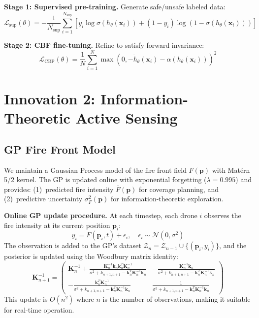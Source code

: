 \documentclass[12pt,a4paper]{article}
\DeclareRobustCommand{\cL}{\mathcal{L}}
\DeclareRobustCommand{\cN}{\mathcal{N}}
\DeclareRobustCommand{\cZ}{\mathcal{Z}}
\DeclareRobustCommand{\vect}[1]{\bm{#1}}
\DeclareRobustCommand{\mat}[1]{\bm{#1}}
\begin{document}
\textbf{Stage 1: Supervised pre-training.} Generate safe/unsafe labeled data:
\begin{equation}
    \cL_{\text{sup}}(\theta) = -\frac{1}{N_{\text{sup}}}\sum_{i=1}^{N_{\text{sup}}} \left[y_i \log \sigma(h_\theta(\vect{x}_i)) + (1-y_i)\log(1-\sigma(h_\theta(\vect{x}_i)))\right]
\end{equation}

\textbf{Stage 2: CBF fine-tuning.} Refine to satisfy forward invariance:
\begin{equation}
    \cL_{\text{CBF}}(\theta) = \frac{1}{N}\sum_{i=1}^{N} \max(0, -\dot{h}_\theta(\vect{x}_i) - \alpha(h_\theta(\vect{x}_i)))^2
\end{equation}


\section{Innovation 2: Information-Theoretic Active Sensing}
\label{sec:info_sensing}

\subsection{GP Fire Front Model}

We maintain a Gaussian Process model of the fire front field $F(\vect{p})$ with Mat\'ern 5/2 kernel. The GP is updated online with exponential forgetting ($\lambda = 0.995$) and provides: (1)~predicted fire intensity $\bar{F}(\vect{p})$ for coverage planning, and (2)~predictive uncertainty $\sigma^2_F(\vect{p})$ for information-theoretic exploration.

\textbf{Online GP update procedure.} At each timestep, each drone $i$ observes the fire intensity at its current position $\vect{p}_i$:
\begin{equation}
    y_i = F(\vect{p}_i, t) + \epsilon_i, \quad \epsilon_i \sim \cN(0, \sigma^2)
\end{equation}
The observation is added to the GP's dataset $\cZ_n = \cZ_{n-1} \cup \{(\vect{p}_i, y_i)\}$, and the posterior is updated using the Woodbury matrix identity:
\begin{equation}
    \mat{K}_{n+1}^{-1} = \begin{pmatrix} \mat{K}_n^{-1} + \frac{\mat{K}_n^{-1}\vect{k}_n\vect{k}_n^T\mat{K}_n^{-1}}{\sigma^2 + k_{n+1,n+1} - \vect{k}_n^T\mat{K}_n^{-1}\vect{k}_n} & -\frac{\mat{K}_n^{-1}\vect{k}_n}{\sigma^2 + k_{n+1,n+1} - \vect{k}_n^T\mat{K}_n^{-1}\vect{k}_n} \\ -\frac{\vect{k}_n^T\mat{K}_n^{-1}}{\sigma^2 + k_{n+1,n+1} - \vect{k}_n^T\mat{K}_n^{-1}\vect{k}_n} & \frac{1}{\sigma^2 + k_{n+1,n+1} - \vect{k}_n^T\mat{K}_n^{-1}\vect{k}_n} \end{pmatrix}
\end{equation}
This update is $O(n^2)$ where $n$ is the number of observations, making it suitable for real-time operation.
\end{document}
